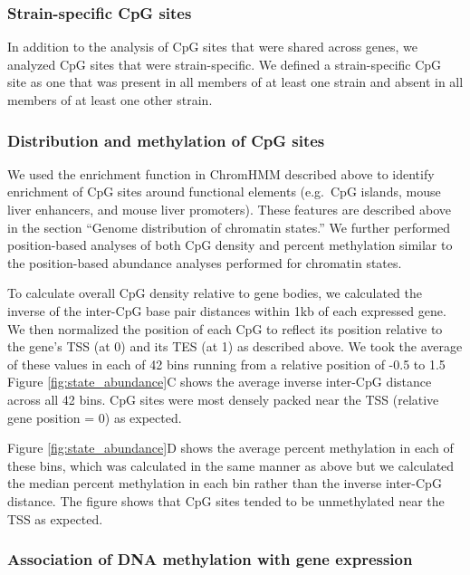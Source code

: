 \documentclass[
  11pt,
]{article}
\begin{document}
\hypertarget{strain-specific-cpg-sites}{%
\subsubsection{Strain-specific CpG
sites}\label{strain-specific-cpg-sites}}

In addition to the analysis of CpG sites that were shared across genes,
we analyzed CpG sites that were strain-specific. We defined a
strain-specific CpG site as one that was present in all members of at
least one strain and absent in all members of at least one other strain.

\hypertarget{distribution-and-methylation-of-cpg-sites}{%
\subsubsection{Distribution and methylation of CpG
sites}\label{distribution-and-methylation-of-cpg-sites}}

We used the enrichment function in ChromHMM described above to identify
enrichment of CpG sites around functional elements (e.g.~CpG islands,
mouse liver enhancers, and mouse liver promoters). These features are
described above in the section ``Genome distribution of chromatin
states.'' We further performed position-based analyses of both CpG
density and percent methylation similar to the position-based abundance
analyses performed for chromatin states.

To calculate overall CpG density relative to gene bodies, we calculated
the inverse of the inter-CpG base pair distances within 1kb of each
expressed gene. We then normalized the position of each CpG to reflect
its position relative to the gene's TSS (at 0) and its TES (at 1) as
described above. We took the average of these values in each of 42 bins
running from a relative position of -0.5 to 1.5 Figure
\ref{fig:state_abundance}C shows the average inverse inter-CpG distance
across all 42 bins. CpG sites were most densely packed near the TSS
(relative gene position = 0) as expected.

Figure \ref{fig:state_abundance}D shows the average percent methylation
in each of these bins, which was calculated in the same manner as above
but we calculated the median percent methylation in each bin rather than
the inverse inter-CpG distance. The figure shows that CpG sites tended
to be unmethylated near the TSS as expected.

\hypertarget{association-of-dna-methylation-with-gene-expression}{%
\subsubsection{Association of DNA methylation with gene
expression}\label{association-of-dna-methylation-with-gene-expression}}
\end{document}
